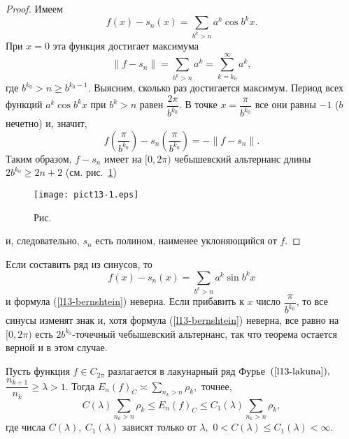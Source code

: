 \begin{proof}
Имеем
$$
f(x)-s_n(x)=\sum\limits_{b^k>n} a^k \cos b^k x.
$$
При $x=0$ эта функция достигает максимума
\begin{equation}\label{l13-bernshtein}
\|f-s_n\|=\sum\limits_{b^k>n} a^k=\sum\limits_{k=k_0}^{\infty}a^k,
\end{equation}
где $b^{k_0}>n\ge b^{k_0-1}.$ Выясним, сколько раз достигается максимум.
Период всех функций $a^k\cos b^kx$ при $b^k>n$ равен
$\dfrac{2\pi}{b^{k_0}}$. В точке $x=\dfrac{\pi}{b^{k_0}}$ все они равны $-1$
{($b$ нечетно)} и, значит,
$$
f\left(\frac{\pi}{b^{k_0}}\right) - s_n\left(\frac{\pi}{b^{k_0}}\right)=-\|f-s_n\|.
$$
Таким образом, $f-s_n$ имеет на $[0,2\pi)$ чебышевский альтернанс длины $2b^{k_0}\ge 2n+2$
{(см. рис.~\ref{r13-1}})

 \bigskip
\begin{figure}[ht]
\begin{center}
\texttt{[image: pict13-1.eps]}
\end{center}
 \bigskip
 \label{r13-1}

 \centerline{Рис.~\theris}
 \bigskip
\end{figure}

и, следовательно, $s_n$ есть полином, наименее уклоняющийся от $f$.
\end{proof}

\begin{Remark}
Если составить ряд из синусов, то
$$
f(x)-s_n(x)=\sum\limits_{b^k>n} a^k \sin b^k x
$$
и формула (\ref{l13-bernshtein}) неверна. Если прибавить к $x$ число
$\dfrac{\pi}{b^{k_0}}$, то все синусы изменят знак и, хотя формула
(\ref{l13-bernshtein}) неверна, все равно на $[0,2\pi)$ есть
$2b^{k_0}$-точечный чебышевский
альтернанс, так что теорема остается верной и в этом случае.
\end{Remark}

\begin{teo}[С.\,Б.\,Стечкин]
Пусть функция {$f\in C_{2\pi}$} разлагается в лакунарный ряд Фурье~{$(\ref{l13-lakuna}),$}
$\dfrac{n_{k+1}}{n_k}\ge \lambda>1.$ Тогда
$E_n(f)_C\asymp \sum\limits_{n_k>n}\rho_k,$ точнее,
$$
C(\lambda)\sum\limits_{n_k>n}\rho_k \le E_n(f)_C\le {C_1(\lambda)}
\sum\limits_{n_k>n}\rho_k,
$$
где числа $C(\lambda),\ C_1(\lambda)$ зависят только от $\lambda,$ $0<C(\lambda)\le
C_1(\lambda)<\infty$.
\end{teo}


